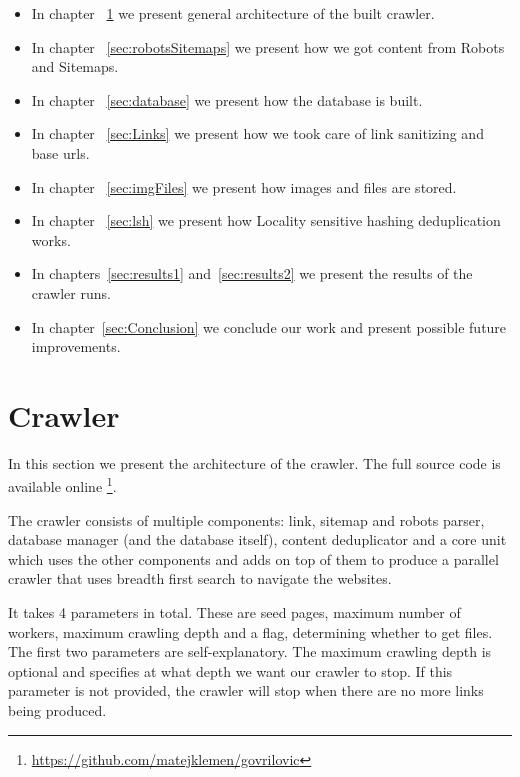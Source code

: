 \documentclass[9pt]{IEEEtran}
\begin{document}

\begin{itemize}
    \item In chapter ~\ref{sec:crawlerArchitecture} we present general architecture of the built crawler.
    \item In chapter ~\ref{sec:robotsSitemaps} we present how we got content from Robots and Sitemaps.
    \item In chapter ~\ref{sec:database} we present how the database is built.
    \item In chapter ~\ref{sec:Links} we present how we took care of link sanitizing and base urls.
    \item In chapter ~\ref{sec:imgFiles} we present how images and files are stored.
    \item In chapter ~\ref{sec:lsh} we present how Locality sensitive hashing deduplication works.
    \item In chapters~\ref{sec:results1} and~\ref{sec:results2} we present the results of the crawler runs.
    \item In chapter~\ref{sec:Conclusion} we conclude our work and present possible future improvements.

\end{itemize}


\section{Crawler}\label{sec:crawlerArchitecture}
In this section we present the architecture of the crawler. 
The full source code is available online \footnote{\url{https://github.com/matejklemen/govrilovic}}.

The crawler consists of multiple components: link, sitemap and robots parser, database manager (and the database itself), content deduplicator and a core unit which uses the other components and adds on top of them to produce a parallel crawler that uses breadth first search to navigate the websites.

It takes 4 parameters in total. These are seed pages, maximum number of workers, maximum crawling depth and a flag, determining whether to get files. 
The first two parameters are self-explanatory.
The maximum crawling depth is optional and specifies at what depth we want our crawler to stop. 
If this parameter is not provided, the crawler will stop when there are no more links being produced.
\end{document}
